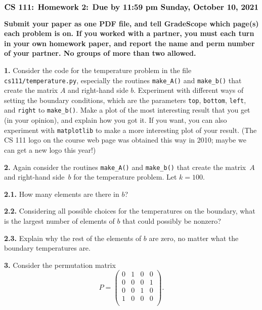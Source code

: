 \documentclass[11pt]{article}
\begin{document}
$$\mbox{\Large \bf CS 111: Homework 2: Due by 11:59 pm Sunday, October 10, 2021}$$
\par\smallskip\noindent
{\bf Submit your paper as one PDF file,
and tell GradeScope which page(s) each problem is on.
If you worked with a partner, you must each turn in your own 
homework paper, and report the name and perm number of your partner.
No groups of more than two allowed.
}

\par\bigskip
{\bf 1.}
Consider the code for the temperature problem in 
the file {\tt cs111/temperature.py}, 
especially the routines {\tt make\_A()} and {\tt make\_b()}
that create the matrix $A$ and right-hand side $b$.
Experiment with different ways of setting the boundary conditions,
which are the parameters {\tt top}, {\tt bottom}, {\tt left}, and {\tt right} 
to {\tt make\_b()}.
Make a plot of the most interesting result that you get (in your opinion), 
and explain how you got it. 
If you want, you can also experiment with {\tt matplotlib} 
to make a more interesting plot of your result. 
(The CS 111 logo on the course web page was obtained this way in 2010; 
maybe we can get a new logo this year!)

\par\bigskip
{\bf 2.}
Again consider the routines {\tt make\_A()} and {\tt make\_b()}
that create the matrix~$A$ and right-hand side~$b$ for the temperature problem.
Let $k=100$.

\par\medskip
{\bf 2.1.}
How many elements are there in $b$?

\par\medskip
{\bf 2.2.}
Considering all possible choices for the temperatures on the boundary,
what is the largest number of elements of $b$ that could possibly 
be nonzero? 

\par\medskip
{\bf 2.3.}
Explain why the rest of the elements of $b$ are zero, no matter
what the boundary temperatures are.

\par\bigskip
{\bf 3.} Consider the permutation matrix 
$$P =
   \left(
   \begin{array}{cccc}
    0 & 1 & 0 & 0 \\ 	
    0 & 0 & 0 & 1 \\ 	
    0 & 0 & 1 & 0 \\ 	
    1 & 0 & 0 & 0 \\ 	
   \end{array} \right).
$$
\end{document}
